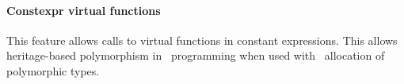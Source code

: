 \documentclass[../../main.tex]{subfiles}
\begin{document}
\paragraph{Constexpr virtual functions} This feature allows calls to virtual
functions in constant expressions\cite{virtual-constexpr}. This allows
heritage-based polymorphism in \constexpr~programming when used with
\constexpr~allocation of polymorphic types.

%
%


%

\end{document}
